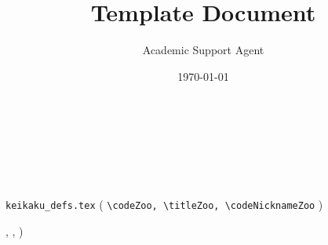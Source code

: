 \documentclass{article}
\title{Template Document}
\author{Academic Support Agent}
\date{\today}
\begin{document}
\maketitle


\section{ }

\JSPSInstructions		%
\textbf{\\ \\
 \\
 }

\subsection{ }
         \texttt{keikaku\_defs.tex} 
        ( 
        \texttt{\textbackslash codeZoo, \textbackslash titleZoo, \textbackslash codeNicknameZoo} ) 
         
         \codeZoo, \titleZoo, \codeNicknameZoo)
         
        

\subsection{ }
         
         

	  

	 



\end{document}
